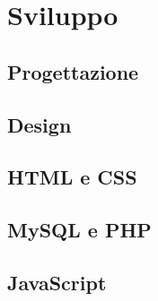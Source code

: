 \section{Sviluppo}

\subsection{Progettazione}

\subsection{Design}

\subsection{HTML e CSS}

\subsection{MySQL e PHP}

\subsection{JavaScript}


